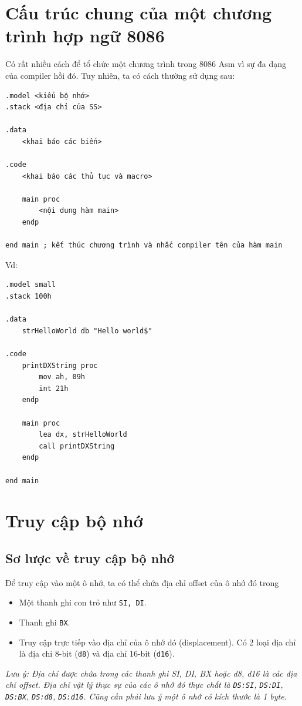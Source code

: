 \documentclass[12pt]{report}
\newcommand{\code}[1]{\texttt{#1}}
\begin{document}

\section{Cấu trúc chung của một chương trình hợp ngữ 8086}
Có rất nhiều cách để tổ chức một chương trình trong 8086 Asm vì sự đa dạng của compiler hồi đó. Tuy nhiên, ta có cách thường sử dụng sau:

\begin{verbatim}
.model <kiểu bộ nhớ>
.stack <địa chỉ của SS>

.data
    <khai báo các biến>

.code 
    <khai báo các thủ tục và macro>

    main proc 
        <nội dung hàm main>
    endp

end main ; kết thúc chương trình và nhắc compiler tên của hàm main
\end{verbatim}
Vd: 
\begin{verbatim}
.model small
.stack 100h

.data
    strHelloWorld db "Hello world$"

.code 
    printDXString proc 
        mov ah, 09h
        int 21h
    endp

    main proc 
        lea dx, strHelloWorld
        call printDXString
    endp

end main 
\end{verbatim}

\section{Truy cập bộ nhớ}
\subsection{Sơ lược về truy cập bộ nhớ}
Để truy cập vào một ô nhớ, ta có thể chứa địa chỉ offset của ô nhớ đó trong
\begin{itemize}
    \item Một thanh ghi con trỏ như \code{SI, DI}.
    \item Thanh ghi \code{BX}.
    \item Truy cập trực tiếp vào địa chỉ của ô nhớ đó (displacement). Có 2 loại địa chỉ là địa chỉ 8-bit (\code{d8}) và địa chỉ 16-bit (\code{d16}).
\end{itemize}

\textit{Lưu ý: Địa chỉ được chứa trong các thanh ghi SI, DI, BX hoặc d8, d16 là các địa chỉ offset. Địa chỉ vật lý thực sự của các ô nhớ đó thực chất là \code{DS:SI}, \code{DS:DI}, \code{DS:BX}, \code{DS:d8}, \code{DS:d16}. Cũng cần phải lưu ý một ô nhớ có kích thước là 1 byte}.
\bigskip
\end{document}
